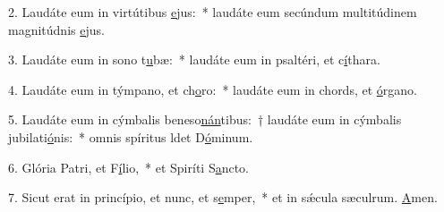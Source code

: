 2. Laudáte eum in virtútibus \uline{e}jus:~* laudáte eum secúndum multitúdinem magnitúdnis \uline{e}jus.\par 
3. Laudáte eum in sono t\uline{u}bæ:~* laudáte eum in psaltéri, et c\uline{í}thara.\par 
4. Laudáte eum in týmpano, et ch\uline{o}ro:~* laudáte eum in chords, et \uline{ó}rgano.\par 
5. Laudáte eum in cýmbalis beneso\uline{nán}tibus:~† laudáte eum in cýmbalis jubilati\uline{ó}nis:~* omnis spíritus ldet D\uline{ó}minum.\par 
6. Glória Patri, et F\uline{í}lio,~* et Spiríti S\uline{a}ncto.\par 
7. Sicut erat in princípio, et nunc, et s\uline{e}mper,~* et in sǽcula sæculrum. \uline{A}men.\par 
